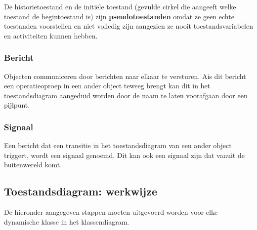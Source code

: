 De historietoestand en de initiële toestand (gevulde cirkel die aangeeft welke toestand de begintoestand is) zijn \textbf{pseudotoestanden} omdat ze geen echte toestanden voorstellen en niet volledig zijn aangezien ze nooit toestandsvariabelen en activiteiten kunnen hebben.

\subsubsection{Bericht}

Objecten communiceren door berichten naar elkaar te versturen. Ais dit bericht een operatieoproep in een ander object teweeg brengt kan dit in het toestandsdiagram aangeduid worden door de naam te laten voorafgaan door een pijlpunt.

\subsubsection{Signaal}

Een bericht dat een transitie in het toestandsdiagram van een ander object triggert, wordt een signaal genoemd. Dit kan ook een signaal zijn dat vanuit de buitenwereld komt.

\subsection{Toestandsdiagram: werkwijze}

De hieronder aangegeven stappen moeten uitgevoerd worden voor elke dynamische klasse in het klassendiagram.

